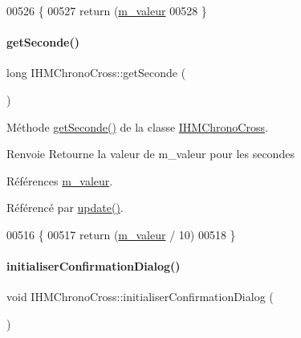 \begin{DoxyCode}
00526 \{
00527     \textcolor{keywordflow}{return} (\hyperlink{class_i_h_m_chrono_cross_a4bb2449f0b2cc9891c09fa3e32f56229}{m\_valeur} %
00528 \}
\end{DoxyCode}
\mbox{\label{class_i_h_m_chrono_cross_a0dfb2dc2b85937b1f218584ce84e9d98}} 
\paragraph{\texorpdfstring{get\+Seconde()}{getSeconde()}}
{\footnotesize\ttfamily long I\+H\+M\+Chrono\+Cross\+::get\+Seconde (\begin{DoxyParamCaption}{ }\end{DoxyParamCaption})\hspace{0.3cm}{\ttfamily [private]}}



Méthode \hyperlink{class_i_h_m_chrono_cross_a0dfb2dc2b85937b1f218584ce84e9d98}{get\+Seconde()} de la classe \hyperlink{class_i_h_m_chrono_cross}{I\+H\+M\+Chrono\+Cross}. 

\begin{DoxyReturn}{Renvoie}
Retourne la valeur de m\+\_\+valeur pour les secondes 
\end{DoxyReturn}


Références \hyperlink{class_i_h_m_chrono_cross_a4bb2449f0b2cc9891c09fa3e32f56229}{m\+\_\+valeur}.



Référencé par \hyperlink{class_i_h_m_chrono_cross_a2cc8b686168528ab0d642a0cba6e1c5a}{update()}.


\begin{DoxyCode}
00516 \{
00517     \textcolor{keywordflow}{return} (\hyperlink{class_i_h_m_chrono_cross_a4bb2449f0b2cc9891c09fa3e32f56229}{m\_valeur} / 10) %
00518 \}
\end{DoxyCode}
\mbox{\label{class_i_h_m_chrono_cross_a866a247fad23eca2af31ed985afe7cd3}} 
\paragraph{\texorpdfstring{initialiser\+Confirmation\+Dialog()}{initialiserConfirmationDialog()}}
{\footnotesize\ttfamily void I\+H\+M\+Chrono\+Cross\+::initialiser\+Confirmation\+Dialog (\begin{DoxyParamCaption}{ }\end{DoxyParamCaption})\hspace{0.3cm}{\ttfamily [private]}}



